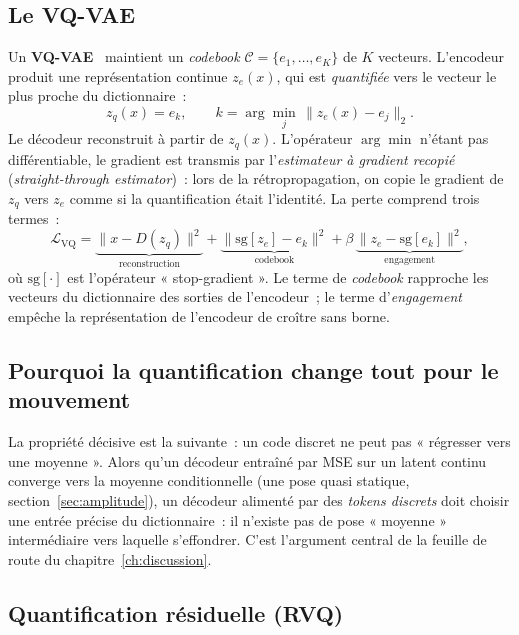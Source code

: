 \documentclass[12pt,a4paper,oneside]{report}
\theoremstyle{definition}
\theoremstyle{plain}
\begin{document}
\subsection{Le VQ-VAE}

Un \textbf{VQ-VAE}~\cite{oord2017vqvae} maintient un \emph{codebook} $\mathcal{C} = \{e_1,\dots,e_K\}$ de
$K$ vecteurs. L'encodeur produit une représentation continue $z_e(x)$, qui est
\emph{quantifiée} vers le vecteur le plus proche du dictionnaire~:
\begin{equation}
z_q(x) = e_k,\qquad k = \arg\min_{j}\,\lVert z_e(x) - e_j\rVert_2 .
\label{eq:vq}
\end{equation}
Le décodeur reconstruit à partir de $z_q(x)$. L'opérateur $\arg\min$ n'étant pas
différentiable, le gradient est transmis par l'\emph{estimateur à gradient
recopié} (\emph{straight-through estimator})~: lors de la rétropropagation, on copie
le gradient de $z_q$ vers $z_e$ comme si la quantification était l'identité. La
perte comprend trois termes~:
\begin{equation}
\mathcal{L}_{\text{VQ}} = \underbrace{\lVert x - D(z_q)\rVert^2}_{\text{reconstruction}}
 + \underbrace{\lVert \mathrm{sg}[z_e] - e_k\rVert^2}_{\text{codebook}}
 + \beta\,\underbrace{\lVert z_e - \mathrm{sg}[e_k]\rVert^2}_{\text{engagement}},
\label{eq:vqloss}
\end{equation}
où $\mathrm{sg}[\cdot]$ est l'opérateur « stop-gradient ». Le terme de
\emph{codebook} rapproche les vecteurs du dictionnaire des sorties de l'encodeur~;
le terme d'\emph{engagement} empêche la représentation de l'encodeur de croître
sans borne.

\subsection{Pourquoi la quantification change tout pour le mouvement}

La propriété décisive est la suivante~: un code discret ne peut pas « régresser vers
une moyenne ». Alors qu'un décodeur entraîné par MSE sur un latent continu converge
vers la moyenne conditionnelle (une pose quasi statique, section~\ref{sec:amplitude}),
un décodeur alimenté par des \emph{tokens discrets} doit choisir une entrée précise
du dictionnaire~: il n'existe pas de pose « moyenne » intermédiaire vers laquelle
s'effondrer. C'est l'argument central de la feuille de route du
chapitre~\ref{ch:discussion}.

\subsection{Quantification résiduelle (RVQ)}
\end{document}
